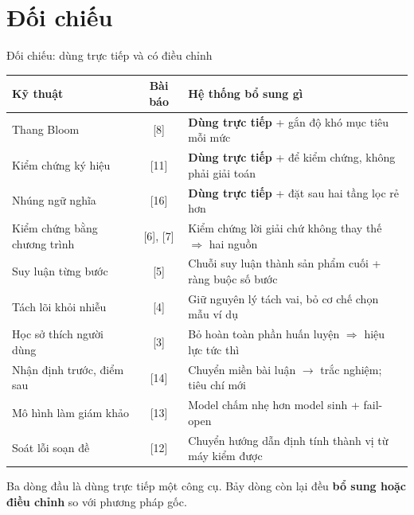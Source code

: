 \documentclass[aspectratio=169,11pt]{beamer}
\newcommand{\dt}[1]{\textcolor{cDet}{\textbf{#1}}}
\renewcommand{\cite}[1]{\textcolor{cMuted}{[#1]}}
\begin{document}
\section{Đối chiếu}
\begin{frame}{Đối chiếu: dùng trực tiếp và có điều chỉnh}
  \vspace{0.1em}
  \begin{center}
  \scriptsize
  \setlength{\tabcolsep}{4pt}
  \renewcommand{\arraystretch}{0.95}
  \begin{tabular}{@{}l c l@{}}
    \toprule
    \textbf{Kỹ thuật} & \textbf{Bài báo} & \textbf{Hệ thống bổ sung gì} \\
    \midrule
    Thang Bloom                  & \cite{8}  & \dt{Dùng trực tiếp} + gắn độ khó mục tiêu mỗi mức \\
    Kiểm chứng ký hiệu           & \cite{11} & \dt{Dùng trực tiếp} + để kiểm chứng, không phải giải toán \\
    Nhúng ngữ nghĩa              & \cite{16} & \dt{Dùng trực tiếp} + đặt sau hai tầng lọc rẻ hơn \\
    \midrule
    Kiểm chứng bằng chương trình & \cite{6}, \cite{7} & \alert{Kiểm chứng lời giải chứ không thay thế} $\Rightarrow$ hai nguồn \\
    Suy luận từng bước           & \cite{5}  & \alert{Chuỗi suy luận thành sản phẩm cuối} + ràng buộc số bước \\
    Tách lõi khỏi nhiễu          & \cite{4}  & Giữ nguyên lý tách vai, bỏ cơ chế chọn mẫu ví dụ \\
    Học sở thích người dùng      & \cite{3}  & \alert{Bỏ hoàn toàn phần huấn luyện} $\Rightarrow$ hiệu lực tức thì \\
    Nhận định trước, điểm sau    & \cite{14} & Chuyển miền bài luận $\rightarrow$ trắc nghiệm; tiêu chí mới \\
    Mô hình làm giám khảo        & \cite{13} & \alert{Model chấm nhẹ hơn model sinh} + fail-open \\
    Soát lỗi soạn đề             & \cite{12} & Chuyển hướng dẫn định tính thành \alert{vị từ máy kiểm được} \\
    \bottomrule
  \end{tabular}
  \end{center}
  {\scriptsize\color{cMuted}Ba dòng đầu là dùng trực tiếp một công cụ. Bảy dòng còn lại đều \textbf{bổ sung hoặc điều chỉnh} so với phương pháp gốc.\par}
\end{frame}
\end{document}
